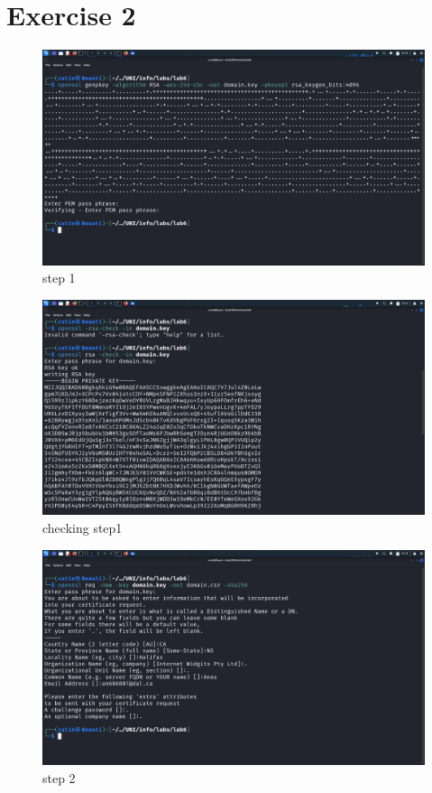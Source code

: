 \documentclass{article}
\numberwithin{equation}{subsection}
\begin{document}
	\newpage
	\section{Exercise 2}
	\begin{center}
	\begin{figure}[H]
		\includegraphics[width=400pt]{pic/2.1.png}
		\caption{step 1}
	\end{figure}

	\begin{figure}[H]
		\includegraphics[width=400pt]{pic/2.1_check.png}
		\caption{checking step1}
	\end{figure}


	\begin{figure}[H]
		\includegraphics[width=400pt]{pic/2.2.png}
		\caption{step 2}
	\end{figure}


\end{center}
\end{document}
